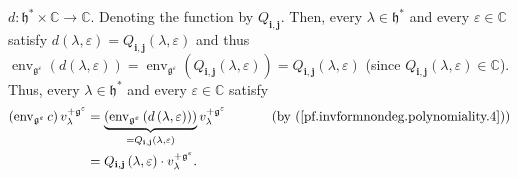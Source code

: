\documentclass
[numbers=enddot,12pt,final,onecolumn,german,notitlepage]{scrartcl}%
\theoremstyle{definition}
\begin{document}
$d:\mathfrak{h}^{\ast}\times\mathbb{C}\rightarrow\mathbb{C}$. Denoting the
function by $Q_{\mathbf{i},\mathbf{j}}$. Then, every $\lambda\in
\mathfrak{h}^{\ast}$ and every $\varepsilon\in\mathbb{C}$ satisfy $d\left(
\lambda,\varepsilon\right)  =Q_{\mathbf{i},\mathbf{j}}\left(  \lambda
,\varepsilon\right)  $ and thus $\operatorname*{env}\nolimits_{\mathfrak{g}%
^{\varepsilon}}\left(  d\left(  \lambda,\varepsilon\right)  \right)
=\operatorname*{env}\nolimits_{\mathfrak{g}^{\varepsilon}}\left(
Q_{\mathbf{i},\mathbf{j}}\left(  \lambda,\varepsilon\right)  \right)
=Q_{\mathbf{i},\mathbf{j}}\left(  \lambda,\varepsilon\right)  $ (since
$Q_{\mathbf{i},\mathbf{j}}\left(  \lambda,\varepsilon\right)  \in\mathbb{C}$).
Thus, every $\lambda\in\mathfrak{h}^{\ast}$ and every $\varepsilon
\in\mathbb{C}$ satisfy%
\begin{align}
\left(  \operatorname*{env}\nolimits_{\mathfrak{g}^{\varepsilon}}c\right)
v_{\lambda}^{+\mathfrak{g}^{\varepsilon}}  &  =\underbrace{\left(
\operatorname*{env}\nolimits_{\mathfrak{g}^{\varepsilon}}\left(  d\left(
\lambda,\varepsilon\right)  \right)  \right)  }_{=Q_{\mathbf{i},\mathbf{j}%
}\left(  \lambda,\varepsilon\right)  }v_{\lambda}^{+\mathfrak{g}^{\varepsilon
}}\ \ \ \ \ \ \ \ \ \ \left(  \text{by (\ref{pf.invformnondeg.polynomiality.4}%
)}\right) \nonumber\\
&  =Q_{\mathbf{i},\mathbf{j}}\left(  \lambda,\varepsilon\right)  \cdot
v_{\lambda}^{+\mathfrak{g}^{\varepsilon}}.
\label{pf.invformnondeg.polynomiality.5}%
\end{align}
\end{document}
